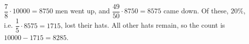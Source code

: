$\dfrac78\cdot10000=8750$ men went up, and $\dfrac{49}{50}\cdot8750=8575$ came down. Of these, $20\%$, i.e. $\dfrac15\cdot8575=1715$, lost their hats. All other hats remain, so the count is $10000-1715=\boxed{8285}$.
